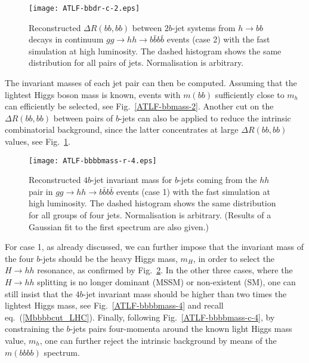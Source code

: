 \begin{figure}[!ht]
\vspace*{-9mm}
\begin{center}
  \texttt{[image: ATLF-bbdr-c-2.eps]} 
  \caption{Reconstructed $\Delta R(bb,bb)$ between
$2b$-jet systems from $h\to bb$ decays 
in continuum $gg\to hh\to b\bar b b\bar b$ events (case 2) with the fast
simulation at high luminosity. The dashed histogram shows the same 
distribution for all pairs of jets.  
Normalisation is arbitrary.}
  \label{ATLF-bbDR-2}
\end{center}
\vspace*{-5mm}
\end{figure}

The invariant masses of each jet pair can then be computed.  Assuming
that the lightest Higgs boson mass is known, events with  $m(bb)$ sufficiently 
close to $m_h$ can efficiently be selected, see
Fig.~\ref{ATLF-bbmass-2}.  Another cut on the $\Delta R(bb,bb)$
between pairs of $b$-jets can also be applied to reduce the intrinsic
combinatorial background, since the latter concentrates at large
$\Delta R(bb,bb)$ values, see Fig.~\ref{ATLF-bbDR-2}.

\begin{figure}[!ht]
\vspace*{-9mm}
\begin{center}
  \texttt{[image: ATLF-bbbbmass-r-4.eps]} 
  \caption{Reconstructed $4b$-jet invariant mass for
    $b$-jets coming from the $hh$ pair in $gg\to hh\to b\bar bb\bar b$
    events (case 1) with the fast simulation at high luminosity.
    The dashed histogram shows the same distribution for all groups of
    four jets.  Normalisation is arbitrary. (Results of a
    Gaussian fit to the first spectrum are also given.)}
  \label{ATLF-bbbbmass-r-4}
\end{center}
\vspace*{-5mm}
\end{figure}

For case 1, as already discussed, we can further impose that the
invariant mass of the four $b$-jets should be the heavy Higgs mass,
$m_H$, in order to select the $H\to hh$ resonance, as confirmed by
Fig.~\ref{ATLF-bbbbmass-r-4}.  In the other three cases, where the
$H\to hh$ splitting is no longer dominant (MSSM) or non-existent (SM),
one can still insist that the $4b$-jet invariant mass should be higher
than two times the lightest Higgs mass, see 
Fig.~\ref{ATLF-bbbbmass-4} and recall
eq.~(\ref{Mbbbbcut_LHC}).  Finally, following
Fig.~\ref{ATLF-bbbbmass-c-4}, by constraining the $b$-jets pairs
four-momenta around the known light Higgs mass value, $m_h$, one can
further reject the intrinsic background by means of the $m(bbbb)$ spectrum.

